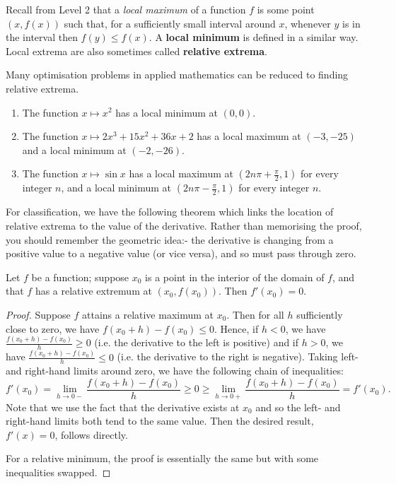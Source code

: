 Recall from Level 2 that a \emph{local maximum} of a function $ f $ is some point $ (x, f(x)) $ such that, for a sufficiently
small interval around $ x $, whenever $ y $ is in the interval then $ f(y) \leq f(x) $. A \textbf{local minimum} is defined in
a similar way. Local extrema are also sometimes called \textbf{relative extrema}.

Many optimisation problems in applied mathematics can be reduced to finding relative extrema.

\begin{exs}\leavevmode
  \begin{enumerate}
    \item The function $ x \mapsto x^2 $ has a local minimum at $ (0, 0) $.
    \item The function $ x \mapsto 2x^3 + 15x^2 + 36x + 2 $ has a local maximum at $ (-3, -25) $ and a local minimum at $ (-2, -26) $.
    \item The function $ x \mapsto \sin x $ has a local maximum at $ (2n\pi + \frac{\pi}{2}, 1) $ for every integer $ n $, and
          a local minimum at $ (2n\pi - \frac{\pi}{2}, 1) $ for every integer $ n $.
  \end{enumerate}
\end{exs}

For classification, we have the following theorem which links the location of relative extrema to the value of the derivative. Rather than
memorising the proof, you should remember the geometric idea:- the derivative is changing from a positive value to a negative value (or vice
versa), and so must pass through zero.

\begin{thm}
  Let $ f $ be a function; suppose $ x_0 $ is a point in the interior of the domain of $ f $, and that $ f $ has a relative extremum
  at $ (x_0, f(x_0)) $. Then $ f'(x_0) = 0 $.
\end{thm}
\begin{proof}
  Suppose $ f $ attains a relative maximum at $ x_0 $. Then for all $ h $ sufficiently close to zero, we have $ f(x_0 + h) - f(x_0) \leq 0 $.
  Hence, if $ h < 0 $, we have $ \frac{f(x_0 + h) - f(x_0)}{h} \geq 0 $ (i.e. the derivative to the left is positive) and if $ h > 0 $, we
  have $ \frac{f(x_0 + h) - f(x_0)}{h} \leq 0 $ (i.e. the derivative to the right is negative). Taking left- and right-hand limits around
  zero, we have the following chain of inequalities:
  \begin{displaymath}
    f'(x_0) = \lim_{h \to 0-} \frac{f(x_0 + h) - f(x_0)}{h} \geq 0 \geq \lim_{h \to 0+} \frac{f(x_0 + h) - f(x_0)}{h} = f'(x_0).
  \end{displaymath}
  Note that we use the fact that the derivative exists at $ x_0 $ and so the left- and right-hand limits both tend to the same value. Then the
  desired result, $ f'(x) = 0 $, follows directly.

  For a relative minimum, the proof is essentially the same but with some inequalities swapped.
\end{proof}

